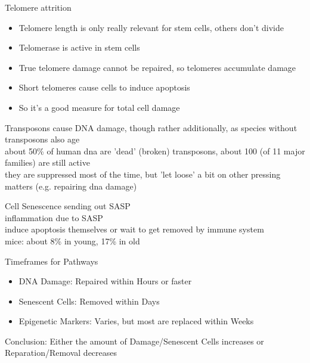 \begin{frame}[c]{Telomere attrition}
    \large
    \begin{itemize}[<+(1)->]
        \item Telomere length is only really relevant for stem cells, others don't divide
        \item Telomerase is active in stem cells
        \item True telomere damage cannot be repaired, so telomeres accumulate damage \cite{NintilTh68:online}
        \item Short telomeres cause cells to induce apoptosis
        \item So it's a good measure for total cell damage \cite{victorelli2017telomeres} 
    \end{itemize}
\end{frame}

\begin{frame}[c]{Transposons}
    cause DNA damage, though rather additionally, as species without transposons also age \\
    about 50\% of human dna are 'dead' (broken) transposons, about 100 (of 11 major families) are still active \\
    they are suppressed most of the time, but 'let loose' a bit on other pressing matters (e.g. repairing dna damage) \\

\end{frame}

\begin{frame}[c]{Cell Senescence}
    sending out SASP \\
    inflammation due to SASP \\
    induce apoptosis themselves or wait to get removed by immune system \\
    mice: about 8\% in young, 17\% in old \\
\end{frame}


\begin{frame}[c]{Timeframes for Pathways}
    \large
    \begin{itemize}[<+(1)->]
        \item DNA Damage: Repaired within Hours or faster \cite{frankenberg1989review}
        \item Senescent Cells: Removed within Days \cite{karin2018senescent}
        \item Epigenetic Markers: Varies, but most are replaced within Weeks \cite{ginno2020genome} \cite{yamagata2012rapid}
    \end{itemize}
    \pause
    Conclusion: Either the amount of Damage/Senescent Cells increases or Reparation/Removal decreases
\end{frame}


